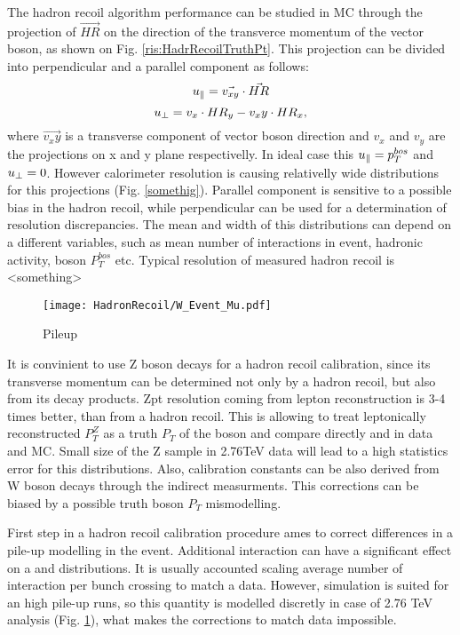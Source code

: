 The hadron recoil algorithm performance can be studied in MC through the projection of $\vec{HR}$ on the direction of the transverce momentum of the vector boson, as shown on Fig. \ref{ris:HadrRecoilTruthPt}. This projection can be divided into perpendicular \uperp and a parallel \upar component as follows:
\begin{equation}
u_{\parallel}=\vec{v_{xy}}\cdot\vec{HR}
\end{equation}
\begin{equation}
u_{\perp}=v_x\cdot HR_y - v_xy \cdot HR_x,
\end{equation}
where $\vec{v_xy}$ is a transverse component of vector boson direction and $v_x$ and $v_y$ are the projections on x and y plane respectivelly. In ideal case this $u_{\parallel}=p_T^{bos}$ and $u_{\perp} = 0$. However calorimeter resolution is causing relativelly wide distributions for this projections (Fig. \ref{somethig}). Parallel component \upar is sensitive to a possible bias in the hadron recoil, while perpendicular \uperp can be used for a determination of resolution discrepancies. The mean and width of this distributions can depend on a different variables, such as mean number of interactions in event, hadronic activity, boson $P_{T}^{bos}$ etc. Typical resolution of measured hadron recoil is <something>

\begin{figure}[!tbp]
\centering
\texttt{[image: HadronRecoil/W\_Event\_Mu.pdf]}
\caption{Pileup}
\label{HadrRecoil:mu}
\end{figure} 
 
It is convinient to use Z boson decays for a hadron recoil calibration, since its transverse momentum can be determined not only by a hadron recoil, but also from its decay products.  Zpt resolution coming from lepton reconstruction is 3-4 times better, than from a hadron recoil. This is allowing to treat leptonically reconstructed $P_T^{Z}$ as a truth $P_T$ of the boson and compare directly \uperp and \upar in data and MC. Small size of the Z sample in 2.76TeV data will lead to a high statistics error for this distributions. Also, calibration constants can be also derived from W boson decays through the indirect measurments. This corrections can be biased by a possible truth boson $P_T$ mismodelling. 
 
 First step in a hadron recoil calibration procedure ames to correct differences in a pile-up modelling in the event. Additional interaction can have a significant effect on a \etmiss and \sumet distributions.   It is usually accounted scaling average number of interaction per bunch crossing to match a data. However, \atlas simulation is suited for an high pile-up runs, so this quantity is modelled discretly in case of 2.76 TeV analysis (Fig. \ref{HadrRecoil:mu}), what makes the corrections to match data impossible. 

